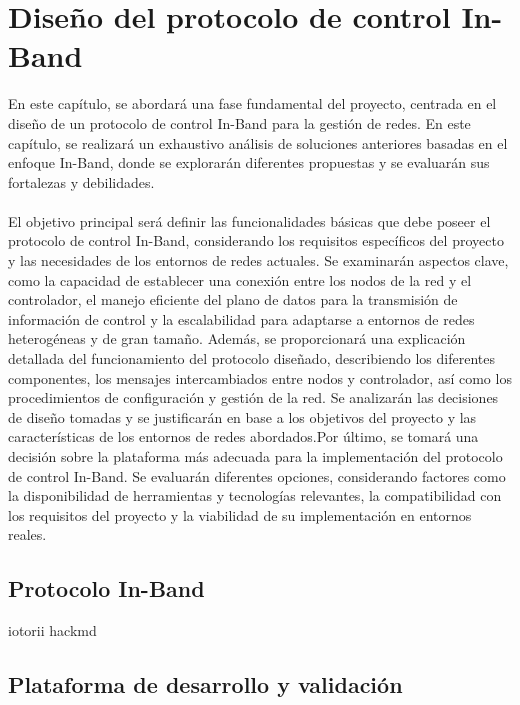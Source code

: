 \chapter{Diseño del protocolo de control In-Band}
\label{ch:analisis}

En este capítulo, se abordará una fase fundamental del proyecto, centrada en el diseño de un protocolo de control In-Band para la gestión de redes. En este capítulo, se realizará un exhaustivo análisis de soluciones anteriores basadas en el enfoque In-Band, donde se explorarán diferentes propuestas y se evaluarán sus fortalezas y debilidades.\\
\\
El objetivo principal será definir las funcionalidades básicas que debe poseer el protocolo de control In-Band, considerando los requisitos específicos del proyecto y las necesidades de los entornos de redes actuales. Se examinarán aspectos clave, como la capacidad de establecer una conexión entre los nodos de la red y el controlador, el manejo eficiente del plano de datos para la transmisión de información de control y la escalabilidad para adaptarse a entornos de redes heterogéneas y de gran tamaño. Además, se proporcionará una explicación detallada del funcionamiento del protocolo diseñado, describiendo los diferentes componentes, los mensajes intercambiados entre nodos y controlador, así como los procedimientos de configuración y gestión de la red. Se analizarán las decisiones de diseño tomadas y se justificarán en base a los objetivos del proyecto y las características de los entornos de redes abordados.Por último, se tomará una decisión sobre la plataforma más adecuada para la implementación del protocolo de control In-Band. Se evaluarán diferentes opciones, considerando factores como la disponibilidad de herramientas y tecnologías relevantes, la compatibilidad con los requisitos del proyecto y la viabilidad de su implementación en entornos reales.

\section{Protocolo In-Band}
\label{sec:ana_inband}

iotorii hackmd

\section{Plataforma de desarrollo y validación}
\label{sec:ana_mininet_wifi}

